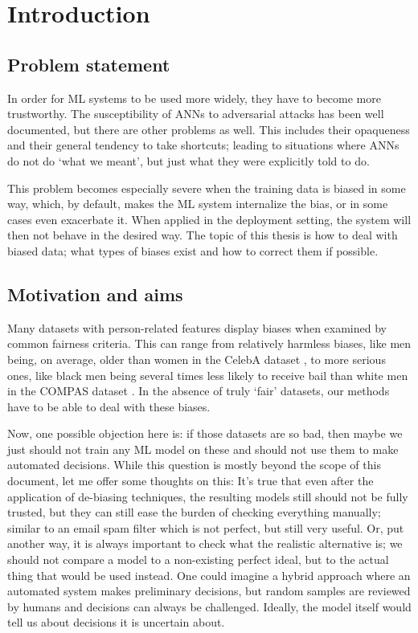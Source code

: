 \chapter{Introduction}\label{ch:introduction}
\section{Problem statement}
In order for \ac{ML} systems to be used more widely,
they have to become more trustworthy.
The susceptibility of \acp{ANN} to adversarial attacks has been well documented, but there are other problems as well.
This includes their opaqueness and their general tendency to take shortcuts;
leading to situations where \acp{ANN} do not do `what we meant', but just what they were explicitly told to do.

This problem becomes especially severe when the training data is biased in some way,
which, by default, makes the \ac{ML} system internalize the bias, or in some cases even exacerbate it.
When applied in the deployment setting, the system will then not behave in the desired way.
The topic of this thesis is how to deal with biased data;
what types of biases exist and how to correct them if possible.

\section{Motivation and aims}
Many datasets with person-related features display biases when examined by common fairness criteria.
This can range from relatively harmless biases,
like men being, on average, older than women in the CelebA dataset \citep{liu2015faceattributes},
to more serious ones,
like black men being several times less likely to receive bail than white men in the COMPAS dataset \citep{angwin2016machine}.
In the absence of truly `fair' datasets, our methods have to be able to deal with these biases.

Now, one possible objection here is:
if those datasets are so bad,
then maybe we just should not train any \ac{ML} model on these and should not use them to make automated decisions.
While this question is mostly beyond the scope of this document, let me offer some thoughts on this:
It's true that even after the application of de-biasing techniques,
the resulting models still should not be fully trusted,
but they can still ease the burden of checking everything manually;
similar to an email spam filter which is not perfect, but still very useful.
Or, put another way, it is always important to check what the realistic alternative is;
we should not compare a model to a non-existing perfect ideal, but to the actual thing that would be used instead.
One could imagine a hybrid approach where an automated system makes preliminary decisions,
but random samples are reviewed by humans and decisions can always be challenged.
Ideally, the model itself would tell us about decisions it is uncertain about.

